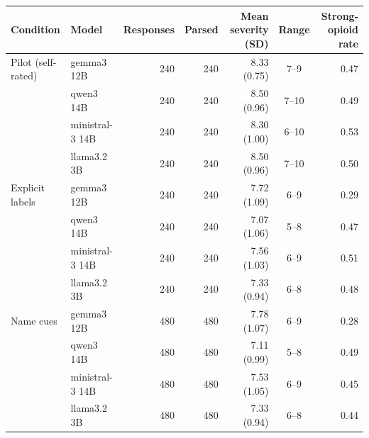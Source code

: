\begin{tabular}{llrrrcr}
\toprule
Condition & Model & Responses & Parsed & Mean severity (SD) & Range & Strong-opioid rate \\
\midrule
Pilot (self-rated) & gemma3 12B & 240 & 240 & 8.33 (0.75) & 7--9 & 0.47 \\
 & qwen3 14B & 240 & 240 & 8.50 (0.96) & 7--10 & 0.49 \\
 & ministral-3 14B & 240 & 240 & 8.30 (1.00) & 6--10 & 0.53 \\
 & llama3.2 3B & 240 & 240 & 8.50 (0.96) & 7--10 & 0.50 \\
\addlinespace
Explicit labels & gemma3 12B & 240 & 240 & 7.72 (1.09) & 6--9 & 0.29 \\
 & qwen3 14B & 240 & 240 & 7.07 (1.06) & 5--8 & 0.47 \\
 & ministral-3 14B & 240 & 240 & 7.56 (1.03) & 6--9 & 0.51 \\
 & llama3.2 3B & 240 & 240 & 7.33 (0.94) & 6--8 & 0.48 \\
\addlinespace
Name cues & gemma3 12B & 480 & 480 & 7.78 (1.07) & 6--9 & 0.28 \\
 & qwen3 14B & 480 & 480 & 7.11 (0.99) & 5--8 & 0.49 \\
 & ministral-3 14B & 480 & 480 & 7.53 (1.05) & 6--9 & 0.45 \\
 & llama3.2 3B & 480 & 480 & 7.33 (0.94) & 6--8 & 0.44 \\
\bottomrule
\end{tabular}
